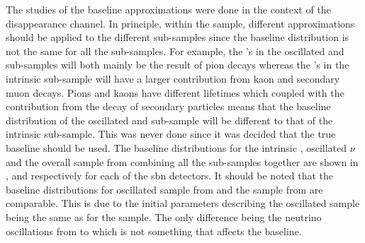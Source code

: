 The studies of the baseline approximations were done in the context of the \numu disappearance channel. In principle, within the \nue sample, different approximations should be applied to the different sub-samples since the baseline distribution is not the same for all the sub-samples. For example, the \numu's in the oscillated and \numu sub-samples will both mainly be the result of pion decays whereas the \nue's in the intrinsic sub-sample will have a larger contribution from kaon and secondary muon decays. Pions and kaons have different lifetimes which coupled with the contribution from the decay of secondary particles means that the baseline distribution of the oscillated and \numu sub-sample will be different to that of the intrinsic \nue sub-sample. This was never done since it was decided that the true baseline should be used. The baseline distributions for the intrinsic \nue, oscillated $\nu$ and the overall \nue sample from combining all the sub-samples together are shown in ,  and  respectively for each of the \gls{sbn} detectors. It should be noted that the baseline distributions for oscillated \nue sample from  and the \numu sample from  are comparable. This is due to the initial parameters describing the oscillated sample being the same as for the \numu sample. The only difference being the neutrino oscillations from \numu to \nue which is not something that affects the baseline.

